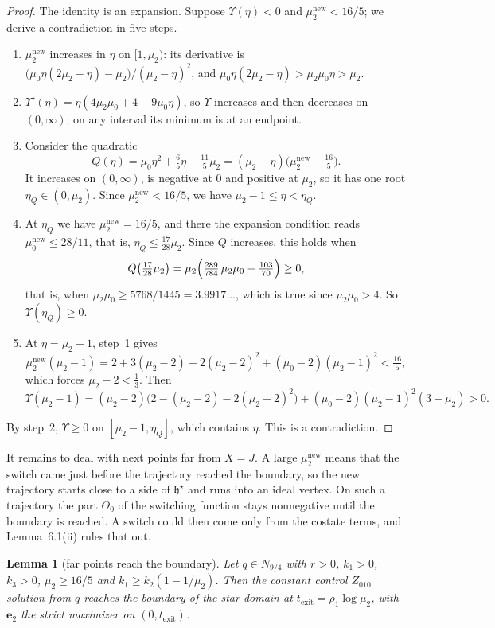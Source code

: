 \documentclass[11pt,a4paper]{article}
\theoremstyle{plain}
\newtheorem{lemma}[theorem]{Lemma}
\theoremstyle{definition}
\theoremstyle{remark}
\newcommand{\hstar}{\mathfrak{h}^{\star}}
\newcommand{\ep}{\mathbf{e}}
\newcommand{\nw}{^{\mathrm{new}}}
\newcommand{\tex}{t_{\mathrm{exit}}}
\begin{document}
\begin{proof}
The identity is an expansion. Suppose $\Upsilon(\eta)<0$ and $\mu_2\nw<16/5$; we derive a
contradiction in five steps.
\begin{enumerate}[itemsep=2pt]
\item $\mu_2\nw$ increases in $\eta$ on $[1,\mu_2)$: its derivative is
$\bigl(\mu_0\eta(2\mu_2-\eta)-\mu_2\bigr)/(\mu_2-\eta)^2$, and
$\mu_0\eta(2\mu_2-\eta)>\mu_2\mu_0\eta>\mu_2$.
\item $\Upsilon'(\eta)=\eta(4\mu_2\mu_0+4-9\mu_0\eta)$, so $\Upsilon$ increases and then decreases on
$(0,\infty)$; on any interval its minimum is at an endpoint.
\item Consider the quadratic
\[
Q(\eta)=\mu_0\eta^2+\tfrac65\eta-\tfrac{11}5\mu_2=(\mu_2-\eta)\bigl(\mu_2\nw-\tfrac{16}5\bigr).
\]
It increases on $(0,\infty)$, is negative at $0$ and positive at $\mu_2$, so it has one root
$\eta_Q\in(0,\mu_2)$. Since $\mu_2\nw<16/5$, we have $\mu_2-1\le\eta<\eta_Q$.
\item At $\eta_Q$ we have $\mu_2\nw=16/5$, and there the expansion condition reads
$\mu_0\nw\le28/11$, that is, $\eta_Q\le\frac{17}{28}\mu_2$. Since $Q$ increases, this holds when
\[
Q\bigl(\tfrac{17}{28}\mu_2\bigr)=\mu_2\Bigl(\tfrac{289}{784}\,\mu_2\mu_0-\tfrac{103}{70}\Bigr)\ge0,
\]
that is, when $\mu_2\mu_0\ge5768/1445=3.9917\ldots$, which is true since $\mu_2\mu_0>4$. So
$\Upsilon(\eta_Q)\ge0$.
\item At $\eta=\mu_2-1$, step~1 gives
\[
\mu_2\nw(\mu_2-1)=2+3(\mu_2-2)+2(\mu_2-2)^2+(\mu_0-2)(\mu_2-1)^2<\tfrac{16}5,
\]
which forces $\mu_2-2<\frac13$. Then
\[
\Upsilon(\mu_2-1)=(\mu_2-2)\bigl(2-(\mu_2-2)-2(\mu_2-2)^2\bigr)+(\mu_0-2)(\mu_2-1)^2(3-\mu_2)>0 .
\]
\end{enumerate}
By step~2, $\Upsilon\ge0$ on $[\mu_2-1,\eta_Q]$, which contains $\eta$. This is a contradiction.
\end{proof}

It remains to deal with next points far from $X=J$. A large $\mu_2\nw$ means that the switch came
just before the trajectory reached the boundary, so the new trajectory starts close to a side of
$\hstar$ and runs into an ideal vertex. On such a trajectory the part $\Theta_0$ of the switching
function stays nonnegative until the boundary is reached. A switch could then come only from the
costate terms, and Lemma~6.1(ii) rules that out.

\begin{lemma}[far points reach the boundary]
Let $q\in N_{9/4}$ with $r>0$, $k_1>0$, $k_3>0$, $\mu_2\ge16/5$ and $k_1\ge k_2(1-1/\mu_2)$. Then
the constant control $Z_{010}$ solution from $q$ reaches the boundary of the star domain at
$\tex=\rho_1\log\mu_2$, with $\ep_2$ the strict maximizer on $(0,\tex)$.
\end{lemma}
\end{document}
